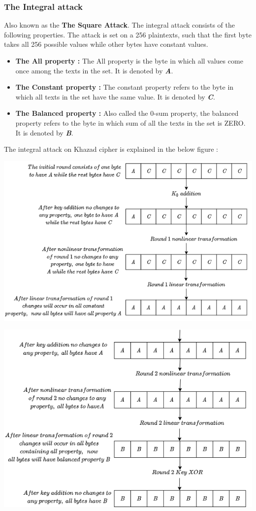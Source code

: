 \documentclass[preprint]{transcrypto}
\begin{document}
\subsubsection{The Integral attack}
Also known as the \textbf{The Square Attack}. The integral attack consists of the following properties.
The attack is set on a
256 plaintexts, such that the first byte takes all 256 possible values
while other bytes have constant values.
\begin{itemize}
    \item \textbf{The All property : }The All property is the byte in which all values come once among the texts in the set. It is denoted by \textit{\textbf{A}}.
    \item \textbf{The Constant property : }The constant property refers to the byte in which all texts in the set have the same value. It is denoted by \textit{\textbf{C}}.
    \item \textbf{The Balanced property : }Also called the 0-sum property, the balanced property refers to the byte in which sum of all the texts in the set is ZERO. It is denoted by \textit{\textbf{B}}.
\end{itemize}
The integral attack on Khazad cipher is explained in the below figure :\cite{1} \\
\begin{center}
    \includegraphics[scale=0.7]{Screenshots/r01.png}  
\end{center} \newpage
\begin{center}
    \includegraphics[scale=0.7]{Screenshots/r12.png}  
\end{center} 
\end{document}
